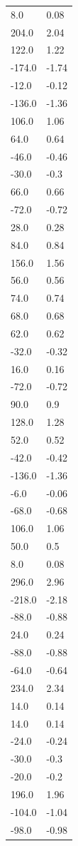 \begin{longtable}{ll}
8.0 & 0.08 \\
204.0 & 2.04 \\
122.0 & 1.22 \\
-174.0 & -1.74 \\
-12.0 & -0.12 \\
-136.0 & -1.36 \\
106.0 & 1.06 \\
64.0 & 0.64 \\
-46.0 & -0.46 \\
-30.0 & -0.3 \\
66.0 & 0.66 \\
-72.0 & -0.72 \\
28.0 & 0.28 \\
84.0 & 0.84 \\
156.0 & 1.56 \\
56.0 & 0.56 \\
74.0 & 0.74 \\
68.0 & 0.68 \\
62.0 & 0.62 \\
-32.0 & -0.32 \\
16.0 & 0.16 \\
-72.0 & -0.72 \\
90.0 & 0.9 \\
128.0 & 1.28 \\
52.0 & 0.52 \\
-42.0 & -0.42 \\
-136.0 & -1.36 \\
-6.0 & -0.06 \\
-68.0 & -0.68 \\
106.0 & 1.06 \\
50.0 & 0.5 \\
8.0 & 0.08 \\
296.0 & 2.96 \\
-218.0 & -2.18 \\
-88.0 & -0.88 \\
24.0 & 0.24 \\
-88.0 & -0.88 \\
-64.0 & -0.64 \\
234.0 & 2.34 \\
14.0 & 0.14 \\
14.0 & 0.14 \\
-24.0 & -0.24 \\
-30.0 & -0.3 \\
-20.0 & -0.2 \\
196.0 & 1.96 \\
-104.0 & -1.04 \\
-98.0 & -0.98 \\

\end{longtable}
